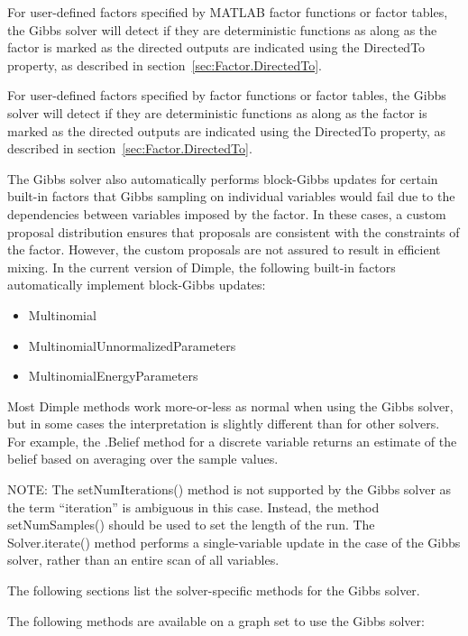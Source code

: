 \ifmatlab
For user-defined factors specified by MATLAB factor functions or factor tables, the Gibbs solver will detect if they are deterministic functions as along as the factor is marked as the directed outputs are indicated using the DirectedTo property, as described in section~\ref{sec:Factor.DirectedTo}.
\fi

\ifjava
For user-defined factors specified by factor functions or factor tables, the Gibbs solver will detect if they are deterministic functions as along as the factor is marked as the directed outputs are indicated using the DirectedTo property, as described in section~\ref{sec:Factor.DirectedTo}.
\fi
 
The Gibbs solver also automatically performs block-Gibbs updates for certain built-in factors that Gibbs sampling on individual variables would fail due to the dependencies between variables imposed by the factor.  In these cases, a custom proposal distribution ensures that proposals are consistent with the constraints of the factor.  However, the custom proposals are not assured to result in efficient mixing.  In the current version of Dimple, the following built-in factors automatically implement block-Gibbs updates:
%
\begin{itemize}
\item Multinomial
\item MultinomialUnnormalizedParameters
\item MultinomialEnergyParameters
\end{itemize}


Most Dimple methods work more-or-less as normal when using the Gibbs solver, but in some cases the interpretation is slightly different than for other solvers. For example, the .Belief method for a discrete variable returns an estimate of the belief based on averaging over the sample values.

NOTE: The setNumIterations() method is not supported by the Gibbs solver as the term ``iteration'' is ambiguous in this case. Instead, the method setNumSamples() should be used to set the length of the run. The Solver.iterate() method performs a single-variable update in the case of the Gibbs solver, rather than an entire scan of all variables.

The following sections list the solver-specific methods for the Gibbs solver.


The following methods are available on a graph set to use the Gibbs solver:

